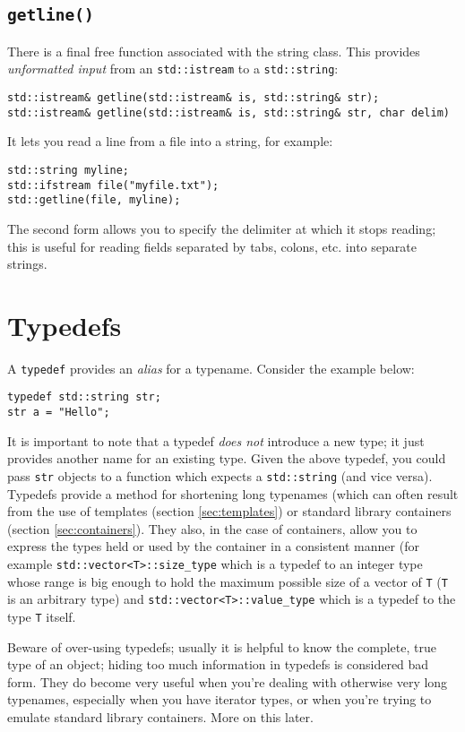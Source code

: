 \documentclass[a4paper]{scrartcl}
\begin{document}
\subsection{\texttt{getline()}}
There is a final free function associated with the string class. This provides \emph{unformatted input} from an \texttt{std::istream} to a \texttt{std::string}:
\begin{verbatim}
std::istream& getline(std::istream& is, std::string& str);
std::istream& getline(std::istream& is, std::string& str, char delim)
\end{verbatim}
It lets you read a line from a file into a string, for example:
\begin{verbatim}
std::string myline;
std::ifstream file("myfile.txt");
std::getline(file, myline);
\end{verbatim}
The second form allows you to specify the delimiter at which it stops reading; this is useful for reading fields separated by tabs, colons, etc. into separate strings.

\section{Typedefs}\label{sec:typedefs}
A \verb|typedef| provides an \emph{alias} for a typename. Consider the example below:

\begin{verbatim}
typedef std::string str;
str a = "Hello";
\end{verbatim}

It is important to note that a typedef \emph{does not} introduce a new type; it just provides another name for an existing type. Given the above typedef, you could pass \verb|str| objects to a function which expects a \verb|std::string| (and vice versa). Typedefs provide a method for shortening long typenames (which can often result from the use of templates (section \ref{sec:templates}) or standard library containers (section \ref{sec:containers}). They also, in the case of containers, allow you to express the types held or used by the container in a consistent manner (for example \verb|std::vector<T>::size_type| which is a typedef to an integer type whose range is big enough to hold the maximum possible size of a vector of \verb|T| (\verb|T| is an arbitrary type) and \verb|std::vector<T>::value_type| which is a typedef to the type \verb|T| itself.

Beware of over-using typedefs; usually it is helpful to know the complete, true type of an object; hiding too much information in typedefs is considered bad form. They do become very useful when you're dealing with otherwise very long typenames, especially when you have iterator types, or when you're trying to emulate standard library containers. More on this later.
\end{document}
